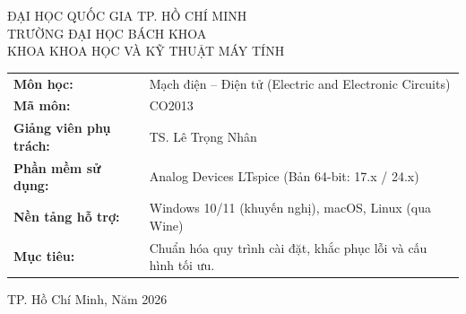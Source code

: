 \documentclass[11pt,a4paper]{article}
\begin{document}
\begin{titlepage}
\centering
\vspace*{0.5cm}
{\scshape\Large ĐẠI HỌC QUỐC GIA TP. HỒ CHÍ MINH\\[0.3cm]
TRƯỜNG ĐẠI HỌC BÁCH KHOA\\[0.3cm]
KHOA KHOA HỌC VÀ KỸ THUẬT MÁY TÍNH\par}

\vspace{1.5cm}

\vspace{1.8cm}

\begin{minipage}{0.95\textwidth}
\begin{tcolorbox}[colback=white,colframe=navy,arc=5pt,boxrule=1.2pt,title=\textbf{THÔNG TIN TÀI LIỆU \& HỌC PHẦN}]
\renewcommand{\arraystretch}{1.35}
\begin{tabularx}{\linewidth}{@{}p{4.2cm}X@{}}
\textbf{Môn học:} & Mạch điện -- Điện tử (Electric and Electronic Circuits) \\
\textbf{Mã môn:} & CO2013 \\
\textbf{Giảng viên phụ trách:} & TS. Lê Trọng Nhân \\
\textbf{Phần mềm sử dụng:} & Analog Devices LTspice (Bản 64-bit: 17.x / 24.x) \\
\textbf{Nền tảng hỗ trợ:} & Windows 10/11 (khuyến nghị), macOS, Linux (qua Wine) \\
\textbf{Mục tiêu:} & Chuẩn hóa quy trình cài đặt, khắc phục lỗi và cấu hình tối ưu.
\end{tabularx}
\end{tcolorbox}
\end{minipage}

\vfill
{\large TP. Hồ Chí Minh, Năm 2026\par}
\end{titlepage}
\end{document}
